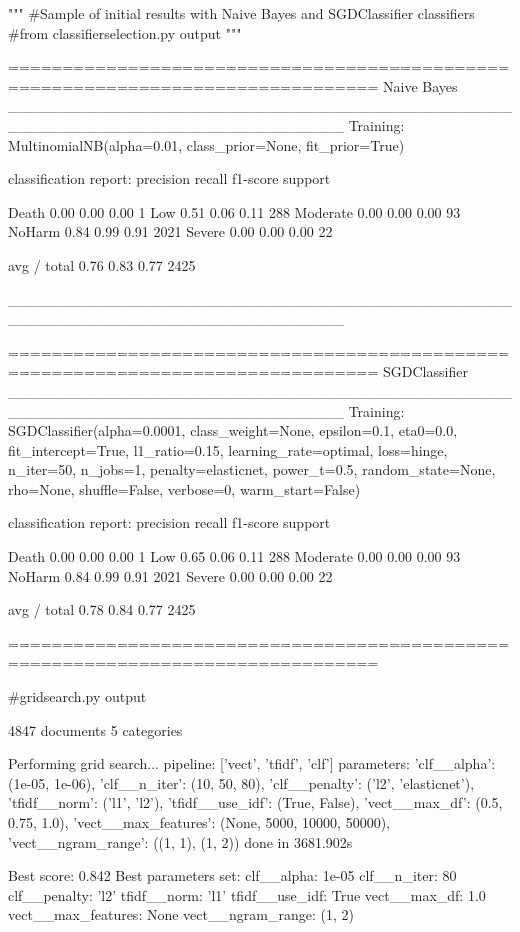 \begin{pyverbatim}
 
"""
#Sample of initial results with Naive Bayes and SGDClassifier classifiers
#from classifierselection.py output
"""

================================================================================
Naive Bayes
________________________________________________________________________________
Training: 
MultinomialNB(alpha=0.01, class_prior=None, fit_prior=True)

classification report:
             precision    recall  f1-score   support

      Death       0.00      0.00      0.00         1
        Low       0.51      0.06      0.11       288
   Moderate       0.00      0.00      0.00        93
     NoHarm       0.84      0.99      0.91      2021
     Severe       0.00      0.00      0.00        22

avg / total       0.76      0.83      0.77      2425


________________________________________________________________________________


================================================================================
SGDClassifier
________________________________________________________________________________
Training: 
SGDClassifier(alpha=0.0001, class_weight=None, epsilon=0.1, eta0=0.0,
       fit_intercept=True, l1_ratio=0.15, learning_rate=optimal,
       loss=hinge, n_iter=50, n_jobs=1, penalty=elasticnet, power_t=0.5,
       random_state=None, rho=None, shuffle=False, verbose=0,
       warm_start=False)

classification report:
             precision    recall  f1-score   support

      Death       0.00      0.00      0.00         1
        Low       0.65      0.06      0.11       288
   Moderate       0.00      0.00      0.00        93
     NoHarm       0.84      0.99      0.91      2021
     Severe       0.00      0.00      0.00        22

avg / total       0.78      0.84      0.77      2425


================================================================================


\end{pyverbatim}

\begin{pyverbatim}
#gridsearch.py output

4847 documents
5 categories

Performing grid search...
pipeline: ['vect', 'tfidf', 'clf']
parameters:
{'clf__alpha': (1e-05, 1e-06),
 'clf__n_iter': (10, 50, 80),
 'clf__penalty': ('l2', 'elasticnet'),
 'tfidf__norm': ('l1', 'l2'),
 'tfidf__use_idf': (True, False),
 'vect__max_df': (0.5, 0.75, 1.0),
 'vect__max_features': (None, 5000, 10000, 50000),
 'vect__ngram_range': ((1, 1), (1, 2))}
done in 3681.902s

Best score: 0.842
Best parameters set:
	clf__alpha: 1e-05
	clf__n_iter: 80
	clf__penalty: 'l2'
	tfidf__norm: 'l1'
	tfidf__use_idf: True
	vect__max_df: 1.0
	vect__max_features: None
	vect__ngram_range: (1, 2)
\end{pyverbatim}


